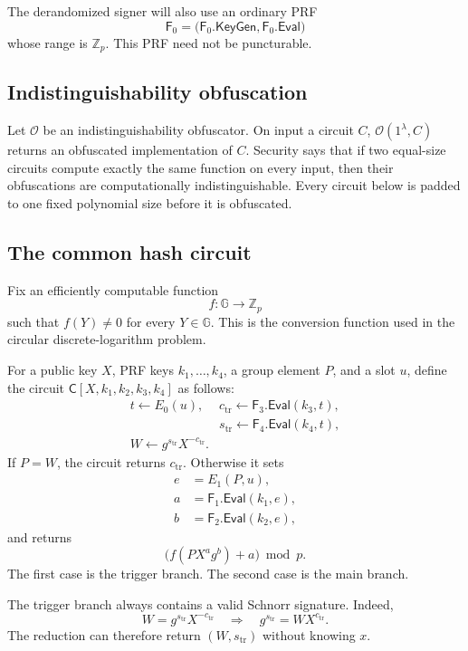 \documentclass[11pt]{article}
\newcommand{\Zp}{\mathbb{Z}_p}
\newcommand{\Eval}{\mathsf{Eval}}
\newcommand{\KeyGen}{\mathsf{KeyGen}}
\newcommand{\Obf}{\mathcal{O}}
\begin{document}
The derandomized signer will also use an ordinary PRF
\[
  \mathsf{F}_0
  =
  \bigl(\mathsf{F}_0.\KeyGen,\mathsf{F}_0.\Eval\bigr)
\]
whose range is \(\Zp\).  This PRF need not be puncturable.

\subsection{Indistinguishability obfuscation}

Let \(\Obf\) be an indistinguishability obfuscator.  On input a circuit \(C\),
\(\Obf(1^\lambda,C)\) returns an obfuscated implementation of \(C\).
Security says that if two equal-size circuits compute exactly the same
function on every input, then their obfuscations are computationally
indistinguishable.  Every circuit below is padded to one fixed polynomial
size before it is obfuscated.

\subsection{The common hash circuit}

Fix an efficiently computable function
\[
  f:\mathbb{G}\longrightarrow\Zp
\]
such that \(f(Y)\ne 0\) for every \(Y\in\mathbb{G}\).  This is the conversion
function used in the circular discrete-logarithm problem.

For a public key \(X\), PRF keys \(k_1,\ldots,k_4\), a group element \(P\),
and a slot \(u\), define the circuit
\(\mathsf{C}[X,k_1,k_2,k_3,k_4]\) as follows:
\[
\begin{array}{ll}
t\gets E_0(u),&
c_{\mathrm{tr}}\gets\mathsf{F}_3.\Eval(k_3,t),\\
&
s_{\mathrm{tr}}\gets\mathsf{F}_4.\Eval(k_4,t),\\[2pt]
W\gets g^{s_{\mathrm{tr}}}X^{-c_{\mathrm{tr}}}.&
\end{array}
\]
If \(P=W\), the circuit returns \(c_{\mathrm{tr}}\).  Otherwise it sets
\[
\begin{aligned}
 e&=E_1(P,u),\\
 a&=\mathsf{F}_1.\Eval(k_1,e),\\
 b&=\mathsf{F}_2.\Eval(k_2,e),
\end{aligned}
\]
and returns
\[
  \bigl(f(PX^a g^b)+a\bigr)\bmod p.
\]
The first case is the trigger branch.  The second case is the main branch.

The trigger branch always contains a valid Schnorr signature.  Indeed,
\[
  W=g^{s_{\mathrm{tr}}}X^{-c_{\mathrm{tr}}}
  \quad\Longrightarrow\quad
  g^{s_{\mathrm{tr}}}=W X^{c_{\mathrm{tr}}}.
\]
The reduction can therefore return
\((W,s_{\mathrm{tr}})\) without knowing \(x\).
\end{document}
